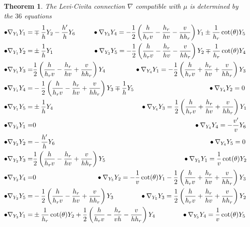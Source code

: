 \documentclass[10pt]{amsart}
\def\th{\theta}
\newtheorem{theorem}{Theorem}[section]
\theoremstyle{definition}
\theoremstyle{remark}
\numberwithin{equation}{section}
\begin{document}
\begin{theorem}\label{thm:connection 1}
The Levi-Civita connection $\nabla$ compatible with $\mu$ is determined by the $36$ equations
	\begin{align*}
	\bullet \nabla_{Y_1}Y_1 = & \mp \frac{1}{h} Y_2 - \frac{h'}{h} Y_6 \hskip 26pt  \bullet \nabla_{Y_3}Y_4 = - \frac{1}{2} \left( \frac{h}{h_r v} - \frac{h_r}{hv} - \frac{v}{hh_r} \right) Y_1 \pm \frac{1}{h_r} \cot(\th) Y_5  \\
	\bullet \nabla_{Y_1}Y_2 = & \pm \frac{1}{h} Y_1    \hskip 60pt	\bullet \nabla_{Y_3}Y_5 =  - \frac{1}{2} \left( \frac{h}{h_r v} - \frac{h_r}{hv} - \frac{v}{hh_r} \right) Y_2 \mp \frac{1}{h_r} \cot(\th) Y_4  \\
	\bullet \nabla_{Y_1}Y_3 = & \frac{1}{2} \left( \frac{h}{h_r v} - \frac{h_r}{hv} + \frac{v}{h h_r} \right) Y_4  \hskip 44pt	  \bullet \nabla_{Y_4}Y_1 = - \frac{1}{2} \left( \frac{h}{h_r v} + \frac{h_r}{hv} + \frac{v}{hh_r} \right) Y_3  \\
	\bullet \nabla_{Y_1}Y_4 = & - \frac{1}{2} \left( \frac{h}{h_r v} - \frac{h_r}{hv} + \frac{v}{hh_r} \right) Y_3 \mp \frac{1}{h} Y_5   \hskip 112pt  \bullet \nabla_{Y_4}Y_2 = 0  \\ %
	\bullet \nabla_{Y_1}Y_5 = & \pm \frac{1}{h} Y_4	\hskip 132pt  \bullet \nabla_{Y_4}Y_3 = \frac{1}{2} \left( \frac{h}{h_r v} + \frac{h_r}{hv} + \frac{v}{hh_r} \right) Y_1  \\
	\bullet \nabla_{Y_2}Y_1 = & 0    \hskip 238pt		\bullet \nabla_{Y_4}Y_4 = - \frac{v'}{v} Y_6  \\
	\bullet \nabla_{Y_2}Y_2 = & - \frac{h'}{h} Y_6	\hskip 232pt  \bullet \nabla_{Y_4}Y_5 = 0  \\
	\bullet \nabla_{Y_2}Y_3 = & \frac{1}{2} \left( \frac{h}{h_r v} - \frac{h_r}{hv} + \frac{v}{h h_r} \right) Y_5  \hskip 117pt  \bullet \nabla_{Y_5}Y_1 = \frac{1}{v} \cot(\th) Y_2  \\ %
	\bullet \nabla_{Y_2}Y_4 = & 0 	\hskip 91pt  \bullet \nabla_{Y_5}Y_2 = - \frac{1}{v} \cot(\th) Y_1 - \frac{1}{2} \left( \frac{h}{h_r v} + \frac{h_r}{hv} + \frac{v}{hh_r} \right) Y_3  \\
	\bullet \nabla_{Y_2}Y_5 = & - \frac{1}{2} \left( \frac{h}{h_r v} - \frac{h_r}{hv} + \frac{v}{h h_r} \right) Y_3 	\hskip 40pt	\bullet \nabla_{Y_5}Y_3 = \frac{1}{2} \left( \frac{h}{h_r v} + \frac{h_r}{hv} + \frac{v}{hh_r} \right) Y_2  \\
	\bullet \nabla_{Y_3}Y_1 = & \pm \frac{1}{h_r} \cot(\th) Y_2 + \frac{1}{2} \left( \frac{h}{h_r v} - \frac{h_r}{vh} - \frac{v}{hh_r} \right) Y_4	\hskip 40pt  \bullet \nabla_{Y_5}Y_4 = \frac{1}{v} \cot(\th) Y_5  \\

\end{align*}
\end{theorem}
\end{document}
